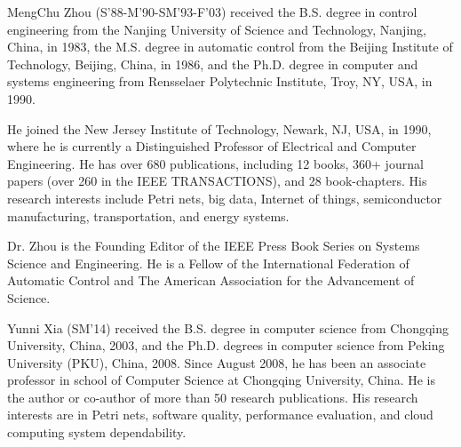 \documentclass[journal]{IEEEtran}
\begin{document}
\begin{IEEEbiography}{MengChu Zhou}
(S'88-M'90-SM'93-F'03) received the B.S. degree in control engineering from the Nanjing University of Science and Technology, Nanjing, China, in 1983, the M.S. degree in automatic control from the Beijing Institute of Technology, Beijing, China, in 1986, and the Ph.D. degree in computer and systems engineering from Rensselaer Polytechnic Institute, Troy, NY, USA, in 1990.

He joined the New Jersey Institute of Technology,
Newark, NJ, USA, in 1990, where he is currently a Distinguished Professor of Electrical and Computer Engineering. He has over 680 publications, including 12 books, 360+ journal papers (over 260 in the IEEE TRANSACTIONS), and 28 book-chapters. His research interests include Petri nets, big data, Internet of things, semiconductor manufacturing,
transportation, and energy systems.

Dr. Zhou is the Founding Editor of the IEEE Press Book Series on Systems
Science and Engineering. He is a Fellow of the International Federation of Automatic Control and The American Association for the Advancement of Science.
\end{IEEEbiography}

\begin{IEEEbiography}{Yunni Xia}
(SM'14) received the B.S. degree in computer science from Chongqing University, China, 2003, and the Ph.D. degrees in computer science from Peking University (PKU), China, 2008. Since August 2008, he has been an associate professor in school of Computer Science at Chongqing University, China. He is the author or co-author of more than 50 research publications. His research interests are in Petri nets, software quality, performance evaluation, and cloud computing system dependability.
\end{IEEEbiography}
\end{document}
